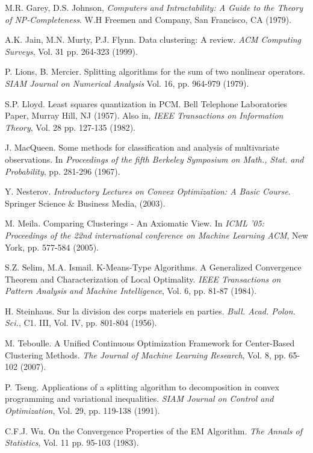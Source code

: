 \documentclass[12pt,a4paper]{report}
\begin{document}
\begin{thebibliography}{99}
 M.R. Garey, D.S. Johnson, \emph{Computers and Intractability: A Guide to the Theory of NP-Completeness}. W.H Freemen and Company, San Francisco, CA (1979).


 A.K. Jain, M.N. Murty, P.J. Flynn. Data clustering: A review. \emph{ACM Computing Surveys}, Vol. 31 pp. 264-323 (1999).


 P. Lions, B. Mercier. Splitting algorithms for the sum of two nonlinear operators. \emph{SIAM Journal on Numerical Analysis} Vol. 16, pp. 964-979 (1979).


 S.P. Lloyd. Least squares quantization in PCM. Bell Telephone Laboratories Paper, Murray Hill, NJ (1957). Also in, \emph{IEEE Transactions on Information Theory}, Vol. 28 pp. 127-135 (1982).


 J. MacQueen. Some methods for classification and analysis of multivariate observations. In \emph{Proceedings of the fifth Berkeley Symposium on Math., Stat. and Probability}, pp. 281-296 (1967).


 Y. Nesterov. \emph{Introductory Lectures on Convex Optimization: A Basic Course}. Springer Science \& Business Media, (2003).


 M. Meila. Comparing Clusterings - An Axiomatic View. In \emph{ICML '05: Proceedings of the 22nd international conference on Machine Learning ACM}, New York, pp. 577-584 (2005).


 S.Z. Selim,  M.A. Ismail. K-Means-Type Algorithms. A Generalized Convergence Theorem and Characterization of Local Optimality. \emph{IEEE Transactions on Pattern Analysis and Machine Intelligence}, Vol. 6, pp. 81-87 (1984).


 H. Steinhaus. Sur la division des corps materiels en parties. \emph{Bull. Acad. Polon. Sci.}, C1. III, Vol. IV, pp. 801-804 (1956). 


 M. Teboulle. A Unified Continuous Optimization Framework for Center-Based Clustering Methods. \emph{The Journal of Machine Learning Research}, Vol. 8, pp. 65-102 (2007).


 P. Tseng. Applications of a splitting algorithm to decomposition in convex programming and variational inequalities. \emph{SIAM Journal on Control and Optimization}, Vol. 29, pp. 119-138 (1991).


  C.F.J. Wu. On the Convergence Properties of the EM Algorithm. \emph{The Annals of Statistics}, Vol. 11 pp. 95-103 (1983).

\end{thebibliography}


\end{document}

